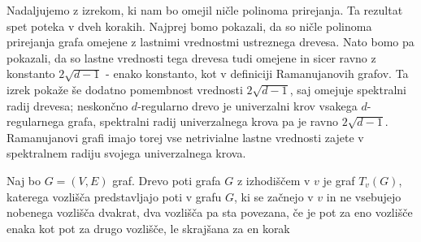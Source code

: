 Nadaljujemo z izrekom, ki nam bo omejil ničle polinoma prirejanja. Ta rezultat spet poteka v dveh korakih. Najprej bomo pokazali, da so ničle polinoma prirejanja grafa omejene z lastnimi vrednostmi ustreznega drevesa. Nato bomo pa pokazali, da so lastne vrednosti tega drevesa tudi omejene in sicer ravno z konstanto \(2\sqrt{d-1}\) - enako konstanto, kot v definiciji Ramanujanovih grafov. Ta izrek pokaže še dodatno pomembnost vrednosti \(2\sqrt{d-1}\), saj omejuje spektralni radij drevesa; neskončno \(d\)-regularno drevo je univerzalni krov vsakega \(d\)-regularnega grafa, spektralni radij univerzalnega krova pa je ravno \(2\sqrt{d-1}\). Ramanujanovi grafi imajo torej vse netrivialne lastne vrednosti zajete v spektralnem radiju svojega univerzalnega krova\cite{hoory}.

\begin{definicija}
    Naj bo \(G=(V, E)\) graf. Drevo poti grafa \(G\) z izhodiščem v \(v\) je graf \(T_v(G)\), katerega vozlišča predstavljajo poti v grafu \(G\), ki se začnejo v \(v\) in ne vsebujejo nobenega vozlišča dvakrat, dva vozlišča pa sta povezana, če je pot za eno vozlišče enaka kot pot za drugo vozlišče, le skrajšana za en korak
\end{definicija}
